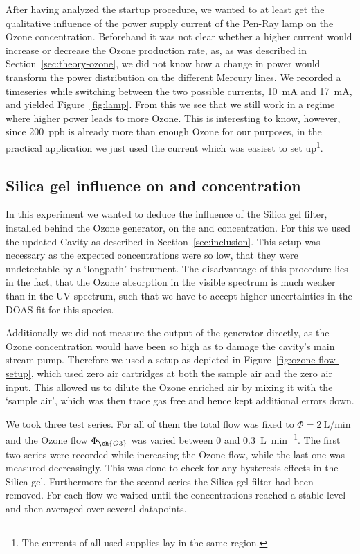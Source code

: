 After having analyzed the startup procedure, we wanted to at least get
the qualitative influence of the power supply current of the Pen-Ray
lamp on the Ozone concentration. Beforehand it was not clear whether a
higher current would increase or decrease the Ozone production rate,
as, as was described in Section~\ref{sec:theory-ozone}, we did not
know how a change in power would transform the power distribution on
the different Mercury lines. We recorded a timeseries while switching
between the two possible currents, \SI{10}{\milli\ampere} and
\SI{17}{\milli\ampere}, and yielded 
Figure~\ref{fig:lamp}. From this we see that we still work in a regime
where higher power leads to more Ozone. This is interesting to know,
however, since \SI{200}{ppb} is already more than enough Ozone for our
purposes, in the practical application we just used the current
which was easiest to set up\footnote{The currents of all used supplies
  lay in the same region.}.

\subsection{Silica gel influence on  and  concentration}
\label{sec:silica}

In this experiment we wanted to deduce the influence of the Silica gel
filter, installed behind the Ozone generator, on the  and
 concentration. For this we used the updated Cavity as
described in Section~\ref{sec:inclusion}. This setup was necessary as
the expected  concentrations were so low, that they were
undetectable by a `longpath' instrument. The disadvantage of this
procedure lies in the fact, that the Ozone absorption in the visible
spectrum is much weaker than in the UV spectrum, such that we have to
accept higher uncertainties in the DOAS fit for this species. 

Additionally we did not measure the output of the generator directly,
as the Ozone concentration would have been so high as to damage the cavity's
main stream pump. Therefore we used a setup as depicted
in Figure~\ref{fig:ozone-flow-setup}, which used zero air cartridges at
both the sample air and the zero air input. This allowed us to dilute
the Ozone enriched air by mixing it with the `sample air', which was
then trace gas free and hence kept additional errors down.

We took three test series. For all of them the total flow was fixed to
$\Phi = \SI{2}{\liter\per\minute}$ and the Ozone flow $\Phi_{\ch{O3}}$
was varied between \num{0} and \SI{0.3}{\liter\per\minute}. The first
two series were recorded while increasing the Ozone flow, while the
last one was measured decreasingly. This was done to check for any
hysteresis effects in the Silica gel. Furthermore for the second
series the Silica gel filter had been removed. For each flow we waited
until the concentrations reached a stable level and then averaged over
several datapoints.


